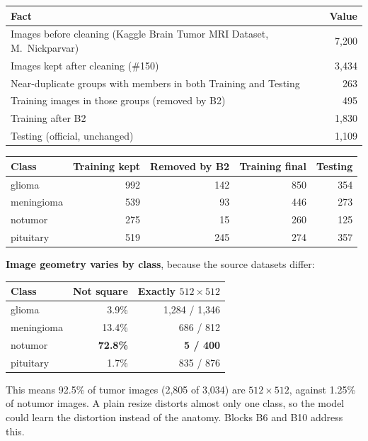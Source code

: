 \documentclass[11pt,a4paper]{article}
\newcommand{\board}[1]{\textsf{\##1}}
\begin{document}
\begin{center}
\begin{tabular}{lr}
\toprule
Fact & Value \\
\midrule
Images before cleaning (Kaggle Brain Tumor MRI Dataset, M.~Nickparvar) & 7,200 \\
Images kept after cleaning (\board{150}) & 3,434 \\
Near-duplicate groups with members in both Training and Testing & 263 \\
Training images in those groups (removed by B2) & 495 \\
Training after B2 & 1,830 \\
Testing (official, unchanged) & 1,109 \\
\bottomrule
\end{tabular}
\end{center}

\begin{center}
\begin{tabular}{lrrrr}
\toprule
Class & Training kept & Removed by B2 & Training final & Testing \\
\midrule
glioma     & 992 & 142 & 850 & 354 \\
meningioma & 539 &  93 & 446 & 273 \\
notumor    & 275 &  15 & 260 & 125 \\
pituitary  & 519 & 245 & 274 & 357 \\
\bottomrule
\end{tabular}
\end{center}

\textbf{Image geometry varies by class}, because the source datasets differ:

\begin{center}
\begin{tabular}{lrr}
\toprule
Class & Not square & Exactly $512\times512$ \\
\midrule
glioma     & 3.9\%           & 1,284 / 1,346 \\
meningioma & 13.4\%          & 686 / 812 \\
notumor    & \textbf{72.8\%} & \textbf{5 / 400} \\
pituitary  & 1.7\%           & 835 / 876 \\
\bottomrule
\end{tabular}
\end{center}

This means 92.5\% of tumor images (2,805 of 3,034) are $512\times512$, against 1.25\% of notumor images. A plain resize distorts almost only one class, so the model could learn the distortion instead of the anatomy. Blocks B6 and B10 address this.
\end{document}

